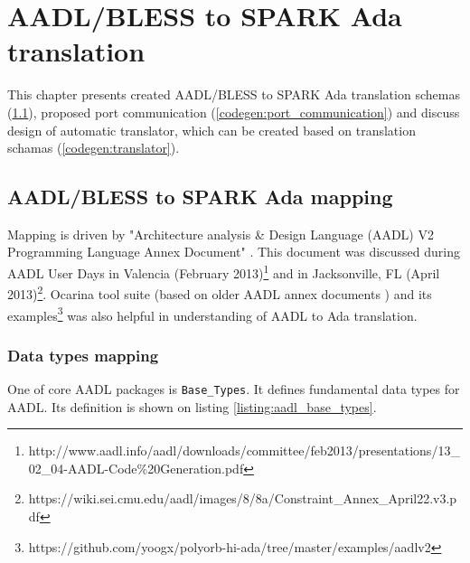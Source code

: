 
\cleardoublepage


\chapter{AADL/BLESS to SPARK Ada translation}
\label{codegen}

This chapter presents created AADL/BLESS to SPARK Ada translation schemas (\ref{codegen:mapping}), proposed port communication (\ref{codegen:port_communication}) and discuss design of automatic translator, which can be created based on translation schamas (\ref{codegen:translator}).



\section{AADL/BLESS to SPARK Ada mapping}
\label{codegen:mapping}


Mapping is driven by "Architecture analysis \& Design Language (AADL) V2 Programming Language Annex Document" \cite{AnnexDoc}. This document was discussed during AADL User Days in Valencia (February 2013)\footnote{http://www.aadl.info/aadl/downloads/committee/feb2013/presentations/13\_02\_04-AADL-Code\%20Generation.pdf} and in Jacksonville, FL (April 2013)\footnote{https://wiki.sei.cmu.edu/aadl/images/8/8a/Constraint\_Annex\_April22.v3.pdf}. Ocarina tool suite (based on older AADL annex documents \cite{Ocarina:Article}) and its examples\footnote{https://github.com/yoogx/polyorb-hi-ada/tree/master/examples/aadlv2} was also helpful in understanding of AADL to Ada translation.




\subsection{Data types mapping}
\label{codegen:mapping:data}

One of core AADL packages is \lstinline{Base_Types}. It defines fundamental data types for AADL. Its definition is shown on listing \ref{listing:aadl_base_types}.

